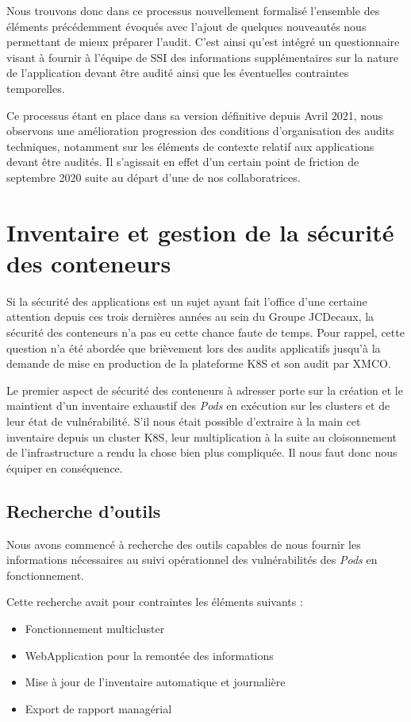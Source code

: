 Nous trouvons donc dans ce processus nouvellement formalisé l'ensemble des éléments précédemment évoqués avec l'ajout 
de quelques nouveautés nous permettant de mieux préparer l'audit. C'est ainsi qu'est intégré un questionnaire visant à
fournir à l'équipe de \ac{SSI} des informations supplémentaires sur la nature de l'application devant être audité ainsi 
que les éventuelles contraintes temporelles.

Ce processus étant en place dans sa version définitive depuis Avril 2021, nous observons une amélioration progression des 
conditions d'organisation des audits techniques, notamment sur les éléments de contexte relatif aux applications devant 
être audités.
Il s'agissait en effet d'un certain point de friction de septembre 2020 suite au départ d'une de nos collaboratrices.

\newpage

\section{Inventaire et gestion de la sécurité des conteneurs}
Si la sécurité des applications est un sujet ayant fait l'office d'une certaine attention depuis ces trois dernières années
au sein du Groupe JCDecaux, la sécurité des conteneurs n'a pas eu cette chance faute de temps.
\newline Pour rappel, cette question n'a été abordée que brièvement lors des audits applicatifs jusqu'à la demande de 
mise en production de la plateforme \ac{K8S} et son audit par XMCO.

Le premier aspect de sécurité des conteneurs à adresser porte sur la création et le maintient d'un inventaire exhaustif
des \emph{Pods} en exécution sur les clusters et de leur état de vulnérabilité. S'il nous était possible d'extraire à la
main cet inventaire depuis un cluster \ac{K8S}, leur multiplication à la suite au cloisonnement de 
l'infrastructure a rendu la chose bien plus compliquée. Il nous faut donc nous équiper en conséquence.

\subsection{Recherche d'outils}
Nous avons commencé à recherche des outils capables de nous fournir les informations nécessaires au suivi opérationnel 
des vulnérabilités des \emph{Pods} en fonctionnement. 

Cette recherche avait pour contraintes les éléments suivants :
\begin{itemize}
    \item Fonctionnement multicluster
    \item WebApplication pour la remontée des informations
    \item Mise à jour de l'inventaire automatique et journalière
    \item Export de rapport managérial
\end{itemize}


